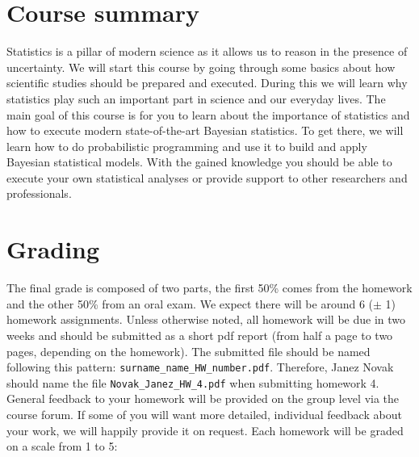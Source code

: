 \documentclass[fleqn,moreauthors,10pt]{ds_report}
\begin{document}
\flushbottom

\maketitle

\thispagestyle{empty}



\section*{Course summary}

Statistics is a pillar of modern science as it allows us to reason in the presence of uncertainty. We will start this course by going through some basics about how scientific studies should be prepared and executed. During this we will learn why statistics play such an important part in science and our everyday lives. The main goal of this course is for you to learn about the importance of statistics and how to execute modern state-of-the-art Bayesian statistics. To get there, we will learn how to do probabilistic programming and use it to build and apply Bayesian statistical models. With the gained knowledge you should be able to execute your own statistical analyses or provide support to other researchers and professionals.

\section*{Grading}

The final grade is composed of two parts, the first 50\% comes from the homework and the other 50\% from an oral exam. We expect there will be around 6 ($\pm$ 1) homework assignments. Unless otherwise noted, all homework will be due in two weeks and should be submitted as a short pdf report (from half a page to two pages, depending on the homework). The submitted file should be named following this pattern: \texttt{surname\_name\_HW\_number.pdf}. Therefore, Janez Novak should name the file \texttt{Novak\_Janez\_HW\_4.pdf} when submitting homework 4. General feedback to your homework will be provided on the group level via the course forum. If some of you will want more detailed, individual feedback about your work, we will happily provide it on request. Each homework will be graded on a scale from 1 to 5:
\end{document}
